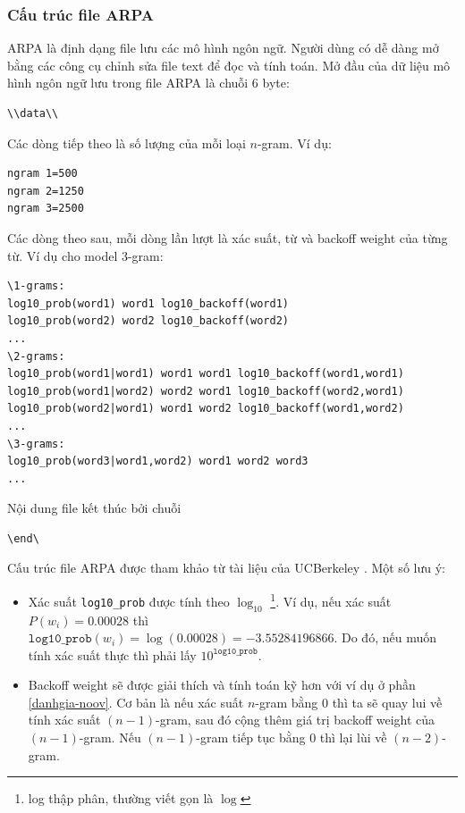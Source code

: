\documentclass[12pt]{article}
\begin{document}
\subsubsection{Cấu trúc file ARPA}
ARPA là định dạng file lưu các mô hình ngôn ngữ. Người dùng có dễ dàng mở bằng các công cụ chỉnh sửa file text để đọc và tính toán. Mở đầu của dữ liệu mô hình ngôn ngữ lưu trong file ARPA là chuỗi 6 byte:
\begin{lstlisting}
\\data\\
\end{lstlisting}
Các dòng tiếp theo là số lượng của mỗi loại $n$-gram. Ví dụ:
\begin{lstlisting}
ngram 1=500
ngram 2=1250
ngram 3=2500
\end{lstlisting}
Các dòng theo sau, mỗi dòng lần lượt là xác suất, từ và backoff weight của từng từ. Ví dụ cho model 3-gram:
\begin{lstlisting}
\1-grams:
log10_prob(word1) word1 log10_backoff(word1)
log10_prob(word2) word2 log10_backoff(word2)
...
\2-grams:
log10_prob(word1|word1) word1 word1 log10_backoff(word1,word1)
log10_prob(word1|word2) word2 word1 log10_backoff(word2,word1)
log10_prob(word2|word1) word1 word2 log10_backoff(word1,word2)
...
\3-grams:
log10_prob(word3|word1,word2) word1 word2 word3
...
\end{lstlisting}
Nội dung file kết thúc bởi chuỗi
\begin{lstlisting}
\end\
\end{lstlisting}
Cấu trúc file ARPA được tham khảo từ tài liệu của UCBerkeley \cite{arpa-definition}.
Một số lưu ý: 
\begin{itemize}
\item Xác suất \texttt{log10\_prob} được tính theo $\log_{10}$ \footnote{log thập phân, thường viết gọn là $\log$}. Ví dụ, nếu xác suất $P(w_i) = 0.00028$ thì $\texttt{log10\_prob}(w_i)= \log(0.00028) = -3.55284196866$. Do đó, nếu muốn tính xác suất thực thì phải lấy $10^{\texttt{log10\_prob}}$.
\item Backoff weight sẽ được giải thích và tính toán kỹ hơn với ví dụ ở phần \ref{danhgia-noov}. Cơ bản là nếu xác suất $n$-gram bằng 0 thì ta sẽ quay lui về tính xác suất $(n - 1)$-gram, sau đó cộng thêm giá trị backoff weight của $(n - 1)$-gram. Nếu $(n - 1)$-gram tiếp tục bằng 0 thì lại lùi về $(n - 2)$-gram.
\end{itemize}
\end{document}

